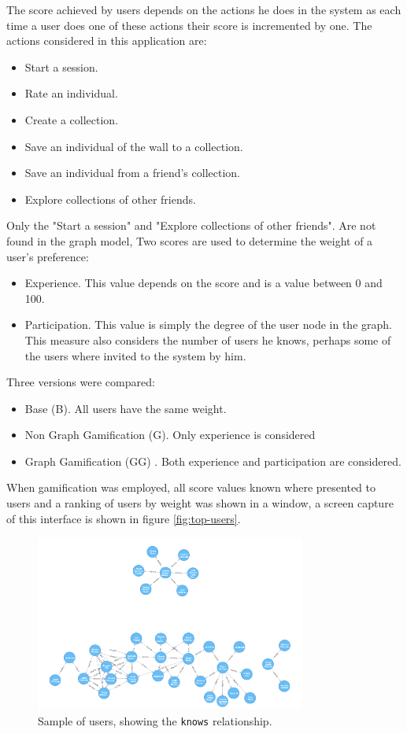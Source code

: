 \documentclass[conference]{IEEEtran}
\begin{document}
The score achieved by users depends on the actions he does in the system as
each time a user does one of these actions their score is incremented by one.
The actions considered in this application are: 
\begin{itemize}
\item Start a session.
\item Rate an individual.
\item Create a collection.
\item Save an individual of the wall to a collection.
\item Save an individual from a friend's collection.
\item Explore collections of other friends.
\end{itemize}
Only the "Start a session" and "Explore collections of other friends". 
Are not found in the graph model, 
Two scores are used to determine the weight of a user's preference:
\begin{itemize}
\item Experience. This value depends on the score and is a value 
between 0 and 100.

\item Participation. This value is simply the degree of the user node 
in the graph. This measure also considers the number of users he knows,
perhaps some of the users where invited to the system by him.   
\end{itemize}

Three versions were compared:
\begin{itemize}
\item Base (B). All users have the same weight.
\item Non Graph Gamification (G). Only experience is considered
\item Graph Gamification (GG) . Both experience and participation are considered.
\end{itemize}
When gamification was employed, all score values known where presented to users
and a ranking of users by weight was shown in a window, a screen capture of
this interface is shown in figure \ref{fig:top-users}. 

\begin{figure}[!t]
    \centering
        \includegraphics[width=3.5in]{img/user_known_2.png}
    \caption{Sample of users, showing the {\tt knows} relationship.}
    \label{fig:users-graph}
\end{figure}
\end{document}
